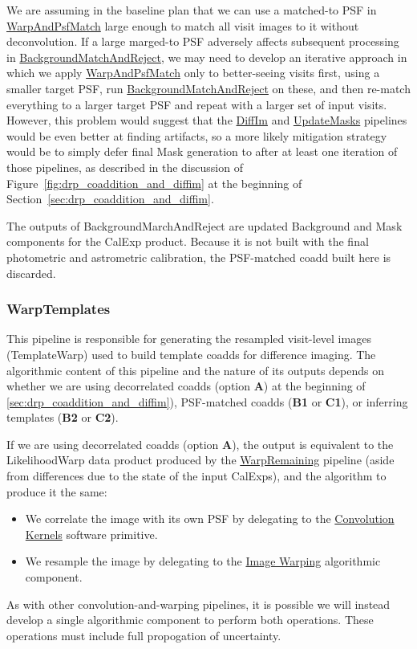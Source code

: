 We are assuming in the baseline plan that we can use a matched-to PSF in \hyperref[sec:drpWarpAndPsfMatch]{WarpAndPsfMatch} large enough to match all visit images to it without deconvolution.  If a large marged-to PSF adversely affects subsequent processing in \hyperref[sec:drpBackgroundMatchAndReject]{BackgroundMatchAndReject}, we may need to develop an iterative approach in which we apply \hyperref[sec:drpWarpAndPsfMatch]{WarpAndPsfMatch} only to better-seeing visits first, using a smaller target PSF, run \hyperref[sec:drpBackgroundMatchAndReject]{BackgroundMatchAndReject} on these, and then re-match everything to a larger target PSF and repeat with a larger set of input visits.  However, this problem would suggest that the \hyperref[sec:drpDiffIm]{DiffIm} and \hyperref[sec:drpUpdateMasks]{UpdateMasks} pipelines would be even better at finding artifacts, so a more likely mitigation strategy would be to simply defer final Mask generation to after at least one iteration of those pipelines, as described in the discussion of Figure~\ref{fig:drp_coaddition_and_diffim} at the beginning of Section~\ref{sec:drp_coaddition_and_diffim}.

The outputs of BackgroundMarchAndReject are updated Background and Mask components for the CalExp product.  Because it is not built with the final photometric and astrometric calibration, the PSF-matched coadd built here is discarded.

\subsubsection{WarpTemplates}
\label{sec:drpWarpTemplates}

This pipeline is responsible for generating the resampled visit-level images (TemplateWarp) used to build template coadds for difference imaging.  The algorithmic content of this pipeline and the nature of its outputs depends on whether we are using decorrelated coadds (option \textbf{A}) at the beginning of \ref{sec:drp_coaddition_and_diffim}), PSF-matched coadds (\textbf{B1} or \textbf{C1}), or inferring templates (\textbf{B2} or \textbf{C2}).

If we are using decorrelated coadds (option \textbf{A}), the output is equivalent to the LikelihoodWarp data product produced by the \hyperref[sec:drpWarpRemaining]{WarpRemaining} pipeline (aside from differences due to the state of the input CalExps), and the algorithm to produce it the same:
\begin{itemize}
\item We correlate the image with its own PSF by delegating to the \hyperref[sec:spKernels]{Convolution Kernels} software primitive.
\item We resample the image by delegating to the \hyperref[sec:acWarping]{Image Warping} algorithmic component.
\end{itemize}
As with other convolution-and-warping pipelines, it is possible we will instead develop a single algorithmic component to perform both operations.  These operations must include full propogation of uncertainty.

